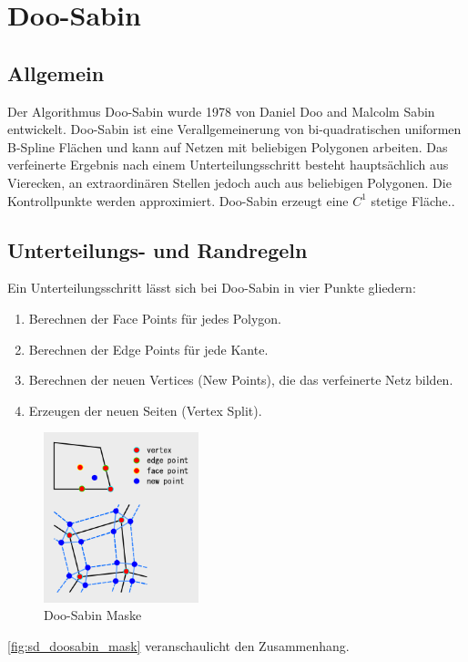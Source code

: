 \section{Doo-Sabin} \label{sec:doosabin}

\subsection{Allgemein}

Der Algorithmus Doo-Sabin wurde 1978 von Daniel Doo and Malcolm Sabin entwickelt.
Doo-Sabin ist eine Verallgemeinerung von bi-quadratischen uniformen B-Spline Flächen
und kann auf Netzen mit beliebigen Polygonen arbeiten.
Das verfeinerte Ergebnis nach einem Unterteilungsschritt besteht hauptsächlich
aus Vierecken, an extraordinären Stellen jedoch auch aus beliebigen Polygonen.
Die Kontrollpunkte werden approximiert.
Doo-Sabin erzeugt eine \(C^1\) stetige Fläche..
\cite[S. 79f]{Zorin.subdivcourse}

\subsection{Unterteilungs- und Randregeln}

Ein Unterteilungsschritt lässt sich bei Doo-Sabin in vier Punkte gliedern:
\begin{enumerate}
\item Berechnen der Face Points für jedes Polygon.
\item Berechnen der Edge Points für jede Kante.
\item Berechnen der neuen Vertices (New Points), die das verfeinerte Netz bilden.
\item Erzeugen der neuen Seiten (Vertex Split).
\end{enumerate}

\begin{figure}
\centering
\includegraphics[width=0.4\textwidth]{content/media/sd_doosabin_mask.png}
\caption{Doo-Sabin Maske \cite{Yoshihitoyagi.doosabin}}
\label{fig:sd_doosabin_mask}
\end{figure}
\autoref{fig:sd_doosabin_mask} veranschaulicht den Zusammenhang.


